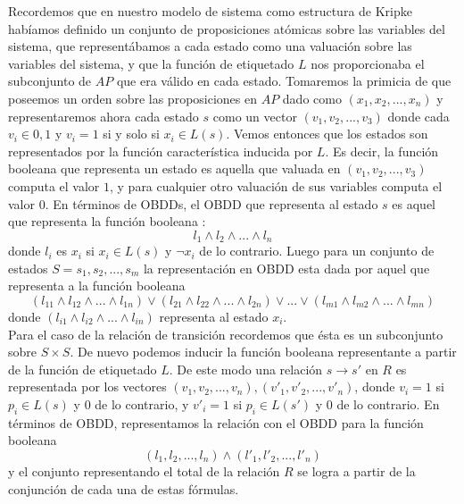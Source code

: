\documentclass[titlepage, 12pt]{book}
\begin{document}
Recordemos que en nuestro modelo de sistema como estructura de Kripke hab\'iamos definido un conjunto de proposiciones at\'omicas sobre las variables del sistema, que represent\'abamos a cada estado como una valuaci\'on sobre las variables del sistema, y que la funci\'on de etiquetado $L$ nos proporcionaba el subconjunto de $AP$ que era v\'alido en cada estado. Tomaremos la primicia de que poseemos un orden sobre las proposiciones en $AP$ dado como $(x_1,x_2,...,x_n)$ y representaremos ahora cada estado $s$ como un vector $(v_1,v_2,...,v_3)$ donde cada $v_i \in {0,1}$ y $v_i = 1$ si y solo si $x_i \in L(s)$. Vemos entonces que los estados son representados por la funci\'on caracter\'istica inducida por $L$. Es decir, la funci\'on booleana que representa un estado es aquella que valuada en $(v_1,v_2,...,v_3)$ computa el valor $1$, y para cualquier otro valuaci\'on de sus variables computa el valor $0$. En t\'erminos de OBDDs, el OBDD que representa al estado $s$ es aquel que representa la funci\'on booleana : $$l_1 \wedge l_2 \wedge ... \wedge l_n$$ donde $l_i$ es $x_i$ si $x_i \in L(s)$ y $\neg x_i$ de lo contrario. Luego para un conjunto de estados $S = {s_1, s_2, ..., s_m}$ la representaci\'on en OBDD esta dada por aquel que representa a la funci\'on booleana $$(l_{11} \wedge l_{12} \wedge ... \wedge l_{1n}) \vee (l_{21} \wedge l_{22} \wedge ... \wedge l_{2n}) \vee ... \vee (l_{m1} \wedge l_{m2} \wedge ... \wedge l_{mn})$$ donde $(l_{i1} \wedge l_{i2} \wedge ... \wedge l_{in})$ representa al estado $x_i$.\\

Para el caso de la relaci\'on de transici\'on recordemos que \'esta es un subconjunto sobre $S\times S$. De nuevo podemos inducir la funci\'on booleana representante a partir de la funci\'on de etiquetado $L$. De este modo una relaci\'on $s\rightarrow s'$ en $R$ es representada por los vectores $(v_1,v_2,...,v_n),(v'_1,v'_2,...,v'_n)$, donde $v_i = 1$ si $p_i \in L(s)$ y $0$ de lo contrario, y $v'_i = 1$ si $p_i \in L(s')$ y $0$ de lo contrario. En t\'erminos de OBDD, representamos la relaci\'on con el OBDD para la funci\'on booleana $$(l_1,l_2,...,l_n) \wedge (l'_1,l'_2,...,l'_n)$$ y el conjunto representando el total de la relaci\'on $R$ se logra a partir de la conjunci\'on de cada una de estas f\'ormulas.








\end{document}
